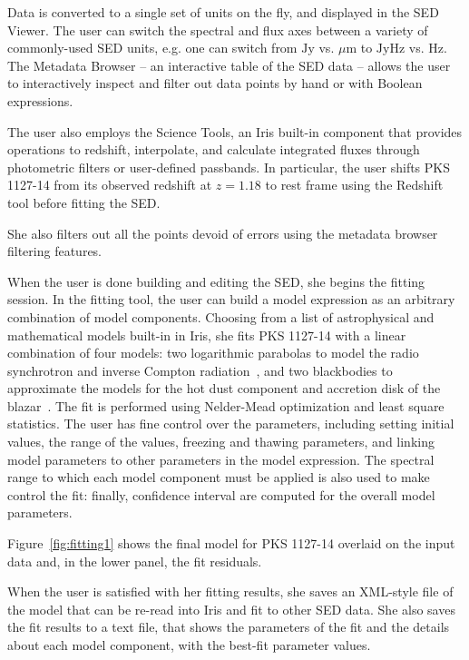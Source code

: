\documentclass[final,5p,authoryear]{elsarticle}
\begin{document}
Data is converted to a single set of units on the fly, and displayed in the SED
Viewer. The user can switch the spectral and flux axes between a variety of
commonly-used SED units, e.g. one can switch from $\mathrm{Jy}$ vs.
${\mu}\mathrm{m}$ to $\mathrm{Jy}\mathrm{Hz}$ vs. $\mathrm{Hz}$. The Metadata
Browser -- an interactive table of the SED data -- allows the user to
interactively inspect and filter out data points by hand or with Boolean
expressions.

The user also employs the Science Tools, an Iris built-in component that
provides operations to redshift, interpolate, and calculate integrated fluxes
through photometric filters or user-defined passbands. In particular, the user
shifts PKS 1127-14 from its observed redshift at $z=1.18$ to rest frame using
the Redshift tool before fitting the SED.

She also filters out all the points devoid of errors using the metadata browser
filtering features.

When the user is done building and editing the SED, she begins the fitting
session. In the fitting tool, the user can build a model expression as an
arbitrary combination of model components. Choosing from a list of astrophysical
and mathematical models built-in in Iris, she fits PKS 1127-14 with a linear
combination of four models: two logarithmic parabolas to model the radio
synchrotron and inverse Compton radiation~\citep{2006A&A...448..861M,2009A&A...501..879T}, and two blackbodies to approximate
the models for the hot dust component and accretion disk of the blazar~\citep{2002ApJ...575..667D}. The fit
is performed using Nelder-Mead optimization and least square statistics. The user
has fine control over the parameters, including setting initial values, the
range of the values, freezing and thawing parameters, and linking model
parameters to other parameters in the model expression. The spectral range to
which each model component must be applied is also used to make control the fit:
finally, confidence interval are computed for the overall model parameters.

Figure~\ref{fig:fitting1} shows the final model for PKS 1127-14 overlaid on the
input data and, in the lower panel, the fit residuals.

When the user is satisfied with her fitting results, she saves an XML-style file
of the model that can be re-read into Iris and fit to other SED data. She also
saves the fit results to a text file, that shows the parameters of the fit and
the details about each model component, with the best-fit parameter values.
\end{document}
